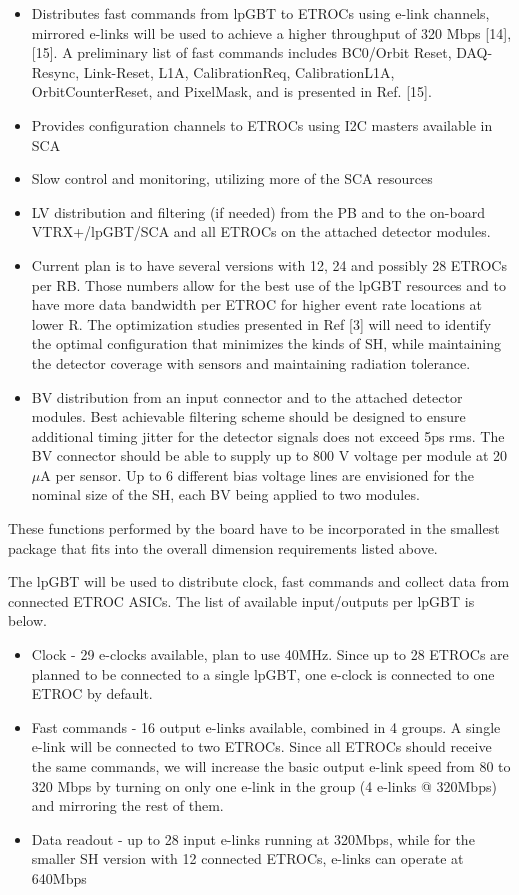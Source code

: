 \documentclass[11pt]{article}
\begin{document}
\begin{itemize}
\item Distributes fast commands from lpGBT to ETROCs using e-link channels, mirrored e-links will be used to achieve a higher throughput of 320 Mbps {[}14{]}, {[}15{]}. A preliminary list of fast commands includes BC0/Orbit Reset, DAQ-Resync, Link-Reset, L1A, CalibrationReq, CalibrationL1A, OrbitCounterReset, and PixelMask, and is presented in Ref. {[}15{]}.
\item Provides configuration channels to ETROCs using I2C masters available in SCA
\item Slow control and monitoring, utilizing more of the SCA resources
\item LV distribution and filtering (if needed) from the PB and to the
  on-board VTRX+/lpGBT/SCA and all ETROCs on the attached detector
  modules.
\item Current plan is to have several versions with 12, 24 and possibly 28 ETROCs per RB. Those numbers allow for the best use of the lpGBT resources and to have more data bandwidth per ETROC for higher event rate locations at lower R. The optimization studies presented in Ref {[}3{]} will need to identify the optimal configuration that minimizes the kinds of SH, while maintaining the detector coverage with sensors and maintaining radiation tolerance.
\item BV distribution from an input connector and to the attached detector modules. Best achievable filtering scheme should be designed to ensure additional timing jitter for the detector signals does not exceed 5ps rms. The BV connector should be able to supply up to 800 V voltage per module at 20 $\mu$A per sensor. Up to 6 different bias voltage lines are envisioned for the nominal size of the SH, each BV being applied to two modules.
\end{itemize}

These functions performed by the board have to be incorporated in the smallest package that fits into the overall dimension requirements listed above.

The lpGBT will be used to distribute clock, fast commands and collect data from connected ETROC ASICs. The list of available input/outputs per lpGBT is below.

\begin{itemize}
\item Clock - 29 e-clocks available, plan to use 40MHz. Since up to 28 ETROCs are planned to be connected to a single lpGBT, one e-clock is connected to one ETROC by default.
\item Fast commands - 16 output e-links available, combined in 4 groups. A single e-link will be connected to two ETROCs. Since all ETROCs should receive the same commands, we will increase the basic output e-link speed from 80 to 320 Mbps by turning on only one e-link in the group (4 e-links @ 320Mbps) and mirroring the rest of them.
\item Data readout - up to 28 input e-links running at 320Mbps, while for the smaller SH version with 12 connected ETROCs, e-links can operate at 640Mbps
\end{itemize}
\end{document}
